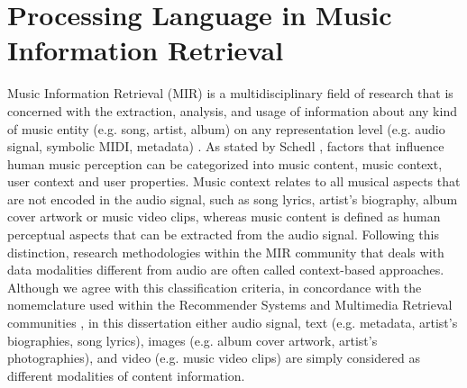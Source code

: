 

\section{Processing Language in Music Information Retrieval}

Music Information Retrieval (MIR) is a multidisciplinary field of research that is concerned with the extraction, analysis, and usage of information about any kind of music entity (e.g. song, artist, album) on any representation level (e.g. audio signal, symbolic MIDI, metadata) \cite{schedl2008}. As stated by Schedl \cite{Schedl2013}, factors that influence human music perception can be categorized into music content, music context, user context and user properties. Music context relates to all musical aspects that are not encoded in the audio signal, such as song lyrics, artist's biography, album cover artwork or music video clips, whereas music content is defined as human perceptual aspects that can be extracted from the audio signal. Following this distinction, research methodologies within the MIR community that deals with data modalities different from audio are often called context-based approaches. 
Although we agree with this classification criteria, in concordance with the nomemclature used within the Recommender Systems and Multimedia Retrieval communities \cite{}, in this dissertation either audio signal, text (e.g. metadata, artist's biographies, song lyrics), images (e.g. album cover artwork, artist's photographies), and video (e.g. music video clips) are simply considered as different modalities of content information.

